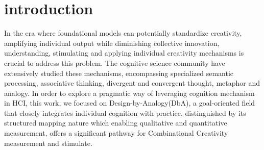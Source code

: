\section{introduction}

In the era where foundational models can potentially standardize creativity, amplifying individual output while diminishing collective innovation\cite{doshi2024generative}, understanding, stimulating and applying individual creativity mechanisms is crucial \cite{kawakami2024impact, hitsuwari2023does, humlum2025large} to address this problem. The cognitive science community have extensively studied these mechanisms, encompassing specialized semantic processing\cite{kenett2023semantic}, associative thinking\cite{beaty2023associative}, divergent and convergent thought\cite{mccrae1987creativity}, metaphor and analogy\cite{holyoak1996mental}. In order to explore a pragmatic way of leveraging cognition mechanism in HCI, this work, we focused on Design-by-Analogy(DbA), a goal-oriented field that closely integrates individual cognition with practice, distinguished by its structured mapping nature which enabling qualitative and quantitative measurement\cite{mcadams2002quantitative}, offers a significant pathway for Combinational Creativity\cite{peng2025probing} measurement and stimulate.




